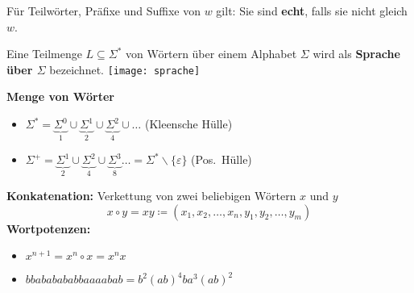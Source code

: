Für Teilwörter, Präfixe und Suffixe von $w$ gilt: Sie sind \textbf{echt}, falls sie nicht gleich $w$.


Eine Teilmenge $L \subseteq \Sigma^*$ von Wörtern über einem Alphabet $\Sigma$ wird als \textbf{Sprache über $\Sigma$} bezeichnet.
\texttt{[image: sprache]}

\textbf{Menge von Wörter}
{\fontsize{6}{7}
    \begin{itemize}
        \item $\Sigma^* = \underbrace{\Sigma^0}_{1} \cup \underbrace{\Sigma^1}_2 \cup \underbrace{\Sigma^2}_4 \cup \dots$ (Kleensche Hülle)
        \item $\Sigma^+ = \underbrace{\Sigma^1}_2 \cup \underbrace{\Sigma^2}_4 \cup \underbrace{\Sigma^3}_8 \dots = \Sigma^* \backslash \{ \varepsilon \}$ (Pos.\ Hülle)
    \end{itemize}
}

\textbf{Konkatenation:} Verkettung von zwei beliebigen Wörtern $x$ und $y$ \[x \circ y = xy \coloneqq (x_1, x_2, \dots, x_n, y_1, y_2, \dots, y_m)\]
\textbf{Wortpotenzen:}
\begin{itemize}
    \item $x^{n+1} = x^n \circ x = x^n x$
    \item $bbababababbaaaabab = b^2 (ab)^4 ba^3 (ab)^2$
\end{itemize}